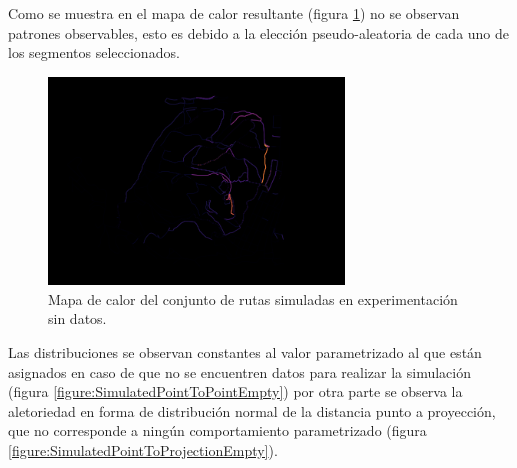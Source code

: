 Como se muestra en el mapa de calor resultante (figura 
\ref{figure:SimulatedHeatMapEmpty}) no se 
observan patrones observables, esto es debido a la elección pseudo-aleatoria de cada 
uno de los segmentos seleccionados.

\begin{figure}[!htb]
\begin{center}
\includegraphics[width=0.7\textwidth]{./Imagenes/HeatMapEmpty.png}
\caption{Mapa de calor del conjunto de rutas simuladas en experimentación sin datos.}
\label{figure:SimulatedHeatMapEmpty}
\end{center}
\end{figure}
\newpage
Las distribuciones se observan constantes al valor parametrizado al que están asignados en caso 
de que no se encuentren datos para realizar la simulación (figura \ref{figure:SimulatedPointToPointEmpty}) por 
otra parte se observa la aletoriedad en forma de distribución normal de la distancia punto a proyección, que no 
corresponde a ningún comportamiento parametrizado (figura \ref{figure:SimulatedPointToProjectionEmpty}).

